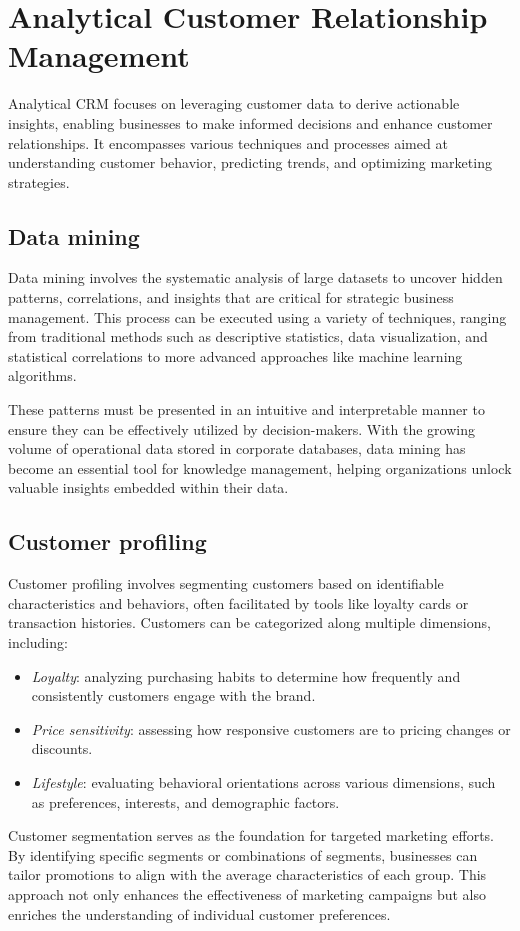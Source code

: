 \section{Analytical Customer Relationship Management}

Analytical CRM focuses on leveraging customer data to derive actionable insights, enabling businesses to make informed decisions and enhance customer relationships. 
It encompasses various techniques and processes aimed at understanding customer behavior, predicting trends, and optimizing marketing strategies.

\subsection{Data mining}
Data mining involves the systematic analysis of large datasets to uncover hidden patterns, correlations, and insights that are critical for strategic business management. 
This process can be executed using a variety of techniques, ranging from traditional methods such as descriptive statistics, data visualization, and statistical correlations to more advanced approaches like machine learning algorithms.

These patterns must be presented in an intuitive and interpretable manner to ensure they can be effectively utilized by decision-makers. 
With the growing volume of operational data stored in corporate databases, data mining has become an essential tool for knowledge management, helping organizations unlock valuable insights embedded within their data.

\subsection{Customer profiling}
Customer profiling involves segmenting customers based on identifiable characteristics and behaviors, often facilitated by tools like loyalty cards or transaction histories. 
Customers can be categorized along multiple dimensions, including:
\begin{itemize}
    \item \textit{Loyalty}: analyzing purchasing habits to determine how frequently and consistently customers engage with the brand.
    \item \textit{Price sensitivity}: assessing how responsive customers are to pricing changes or discounts.
    \item \textit{Lifestyle}: evaluating behavioral orientations across various dimensions, such as preferences, interests, and demographic factors.
\end{itemize}
\noindent Customer segmentation serves as the foundation for targeted marketing efforts. 
By identifying specific segments or combinations of segments, businesses can tailor promotions to align with the average characteristics of each group.
This approach not only enhances the effectiveness of marketing campaigns but also enriches the understanding of individual customer preferences.

